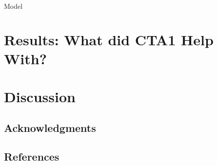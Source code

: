 \documentclass{edm_template}
\begin{document}
Model

\section{Results: What did CTA1 Help With?}
\section{Discussion}

\subsection{Acknowledgments}
\subsection{References}
\end{document}
